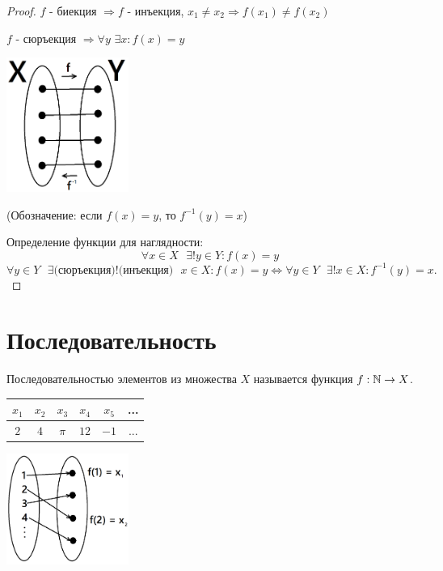 	\begin{proof}
		$f$ - биекция $\Rightarrow f$ - инъекция, $x_1 \neq x_2 \Rightarrow f(x_1) \neq f(x_2)$
		
		$f$ - сюръекция $\Rightarrow \forall y$ $\exists x: f(x) = y$
		
		\begin{center}
		    \includegraphics[width=0.3\textwidth]{img/lecture1/proof_bijection}
		\end{center}
		(Обозначение: если $f(x) = y$, то $f^{-1}(y) = x$)
		
		Определение функции для наглядности: 
		\[ \forall x \in X \text{ } \exists! y \in Y : f(x) = y \]
		\[ \forall y \in Y \text{ } \exists \text{(сюръекция)} ! \text{(инъекция)} \text{ } x \in X : f(x) = y \Leftrightarrow \forall y \in Y \text{ } \exists! x \in X : f^{-1}(y) = x. \]
	\end{proof}
	
	\section{Последовательность}
	
	\begin{definition}
		Последовательностью элементов из множества $X$ называется функция $f: \mathbb N \rightarrow X$.
	\end{definition}
	
	\begin{example}
		\begin{tabular}{|c|c|c|c|c|c|}
			\hline
			$x_1$ & $x_2$ & $x_3$ & $x_4$ & $x_5$ & ... \\
			\hline
			$2$ & $4$ & $\pi$ & $12$ & $-1$ & ... \\
			\hline
		\end{tabular}
		
		\begin{center}
			\includegraphics[width=0.3\textwidth]{img/lecture1/sequence}
		\end{center}
	\end{example}
	
